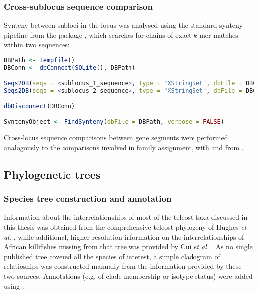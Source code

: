\subsubsection{Cross-sublocus sequence comparison}
\label{sec:methods_comp_locus_synteny}

Synteny between subloci in the \Nfu locus was analysed using the standard synteny pipeline from the  package  \parencite{wright2016decipher}, which searches for chains of exact $k$-mer matches within two sequences:

\begin{lstlisting}[language=R]
DBPath <- tempfile()
DBConn <- dbConnect(SQLite(), DBPath)

Seqs2DB(seqs = <sublocus_1_sequence>, type = "XStringSet", dbFile = DBConn, identifier = "IGH1", verbose = FALSE)
Seqs2DB(seqs = <sublocus_2_sequence>, type = "XStringSet", dbFile = DBConn, identifier = "IGH2", verbose = FALSE)

dbDisconnect(DBConn)

SyntenyObject <- FindSynteny(dbFile = DBPath, verbose = FALSE)
\end{lstlisting}

\noindent Cross-locus sequence comparisons between gene segments were performed analogously to the comparisons involved in \vh family assignment, with  and  from .


\subsection{Phylogenetic trees}
\label{sec:methods_comp_trees}


\subsubsection{Species tree construction and annotation}
\label{sec:methods_comp_trees_species}

Information about the interrelationships of most of the teleost taxa discussed in this thesis was obtained from the comprehensive teleost phylogeny of Hughes \textit{et al.} \parencite{hughes2018teleostphylo}, while additional, higher-resolution information on the interrelationships of African killifishes missing from that tree was provided by Cui \textit{et al.} \parencite{cui2019annual}. As no single published tree covered all the species of interest, a simple cladogram of relatioships was constructed manually from the information provided by these two sources. Annotations (e.g. of clade membership or isotype status) were added using  \parencite{guangchuang2018tidytree}.

